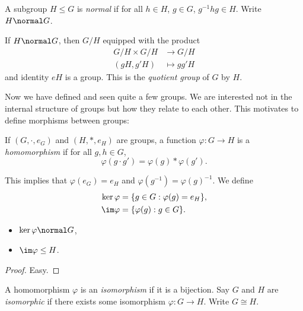 \documentclass[a4paper]{article}
\begin{document}
\begin{definition}
  A subgroup \(H \leq G\) is \emph{normal} if for all \(h \in H\), \(g \in G\), \(g^{-1}hg \in H\). Write \(H \normal G\).
\end{definition}

\begin{definition}
  If \(H \normal G\), then \(G/H\) equipped with the product
  \begin{align*}
    G/H \times G/H &\to G/H \\
    (gH, g'H) &\mapsto gg'H
  \end{align*}
  and identity \(eH\) is a group. This is the \emph{quotient group} of \(G\) by \(H\).
\end{definition}

Now we have defined and seen quite a few groups. We are interested not in the internal structure of groups but how they relate to each other. This motivates to define morphisms between groups:

\begin{definition}[Homomorphism]
  If \((G, \cdot, e_G)\) and \((H, *, e_H)\) are groups, a function \(\varphi: G \to H\) is a \emph{homomorphism} if for all \(g, h \in G\),
  \[
    \varphi(g \cdot g') = \varphi(g) * \varphi(g').
  \]
\end{definition}

This implies that \(\varphi(e_G) = e_H\) and \(\varphi(g^{-1}) = \varphi(g)^{-1}\). We define
\begin{align*}
  \ker \varphi &= \{g \in G: \varphi(g) = e_H\}, \\
  \im \varphi &= \{\varphi(g): g \in G\}.
\end{align*}

\begin{lemma}\leavevmode
  \begin{itemize}
  \item \(\ker \varphi \normal G\),
  \item \(\im \varphi \leq H\).
  \end{itemize}
\end{lemma}

\begin{proof}
  Easy.
\end{proof}

\begin{definition}[Isomorphism]
  A homomorphism \(\varphi\) is an \emph{isomorphism} if it is a bijection. Say \(G\) and \(H\) are \emph{isomorphic} if there exists some isomorphism \(\varphi: G \to H\). Write \(G \cong H\).
\end{definition}
\end{document}
